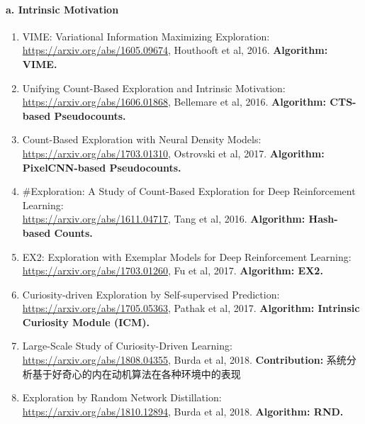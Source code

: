 \documentclass[lang=cn,11pt,a4paper]{eleganttemplate}
\begin{document}
\paragraph{a. Intrinsic Motivation}
\begin{enumerate}
    \item VIME: Variational Information Maximizing Exploration:\\ \href{https://arxiv.org/abs/1605.09674}{https://arxiv.org/abs/1605.09674}, Houthooft et al, 2016. \textbf{Algorithm: VIME.}
    \item Unifying Count-Based Exploration and Intrinsic Motivation:\\ \href{https://arxiv.org/abs/1606.01868}{https://arxiv.org/abs/1606.01868}, Bellemare et al, 2016. \textbf{Algorithm: CTS-based Pseudocounts.}
    \item Count-Based Exploration with Neural Density Models:\\ \href{https://arxiv.org/abs/1703.01310}{https://arxiv.org/abs/1703.01310}, Ostrovski et al, 2017. \textbf{Algorithm: PixelCNN-based Pseudocounts.}
    \item \#Exploration: A Study of Count-Based Exploration for Deep Reinforcement Learning:\\ \href{https://arxiv.org/abs/1611.04717}{https://arxiv.org/abs/1611.04717}, Tang et al, 2016. \textbf{Algorithm: Hash-based Counts.}
    \item EX2: Exploration with Exemplar Models for Deep Reinforcement Learning:\\ \href{https://arxiv.org/abs/1703.01260}{https://arxiv.org/abs/1703.01260}, Fu et al, 2017. \textbf{Algorithm: EX2.}
    \item Curiosity-driven Exploration by Self-supervised Prediction:\\ \href{https://arxiv.org/abs/1705.05363}{https://arxiv.org/abs/1705.05363}, Pathak et al, 2017. \textbf{Algorithm: Intrinsic Curiosity Module (ICM).}
    \item Large-Scale Study of Curiosity-Driven Learning:\\ \href{https://arxiv.org/abs/1808.04355}{https://arxiv.org/abs/1808.04355}, Burda et al, 2018. \textbf{Contribution:} 系统分析基于好奇心的内在动机算法在各种环境中的表现
    \item Exploration by Random Network Distillation:\\ \href{https://arxiv.org/abs/1810.12894}{https://arxiv.org/abs/1810.12894}, Burda et al, 2018. \textbf{Algorithm: RND.}
\end{enumerate}
\end{document}
